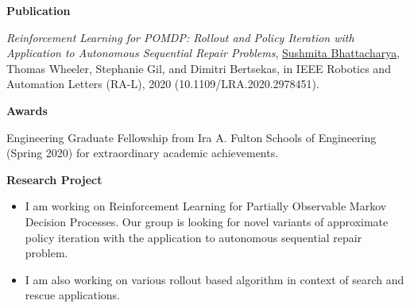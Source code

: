 \documentclass[a4paper,11pt]{article}
\newcommand{\resheading}[1]{{\small \colorbox{mygrey}{\begin{minipage}{0.975\textwidth}{\textbf{#1 \vphantom{p\^{E}}}}\end{minipage}}}}
\begin{document}
\resheading{\textbf{\large Publication}}
\begin{description}
	\item \hspace{0.65 cm} \textit{Reinforcement Learning for POMDP: Rollout and Policy Iteration with Application to Autonomous Sequential Repair Problems}, \underline{Sushmita Bhattacharya}, Thomas Wheeler, Stephanie Gil, and Dimitri Bertsekas, in IEEE Robotics and Automation Letters (RA-L), 2020 (10.1109/LRA.2020.2978451).
\end{description}

\resheading{\textbf{\large Awards}}
\begin{description}
	\item \hspace{0.65 cm} Engineering Graduate Fellowship from Ira A. Fulton Schools of Engineering (Spring 2020) for extraordinary academic achievements.
	
\end{description}

\resheading{\textbf{\large Research Project}}
\begin{description}
	\item 
	\begin{itemize}
		\item I am working on Reinforcement Learning for Partially Observable Markov Decision Processes. Our group is looking for novel variants of approximate policy iteration with the application to autonomous sequential repair problem. 
	\end{itemize}
\item 
	\begin{itemize}
		\item I am also working on various rollout based algorithm in context of search and rescue applications.
	\end{itemize}
\end{description}
\end{document}
